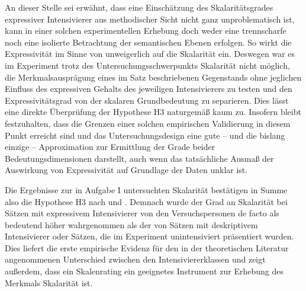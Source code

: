 An dieser Stelle sei erwähnt, dass eine Einschätzung des Skalaritätsgrades expressiver Intensivierer aus methodischer Sicht nicht ganz unproblematisch ist, kann in einer solchen experimentellen Erhebung doch weder eine trennscharfe noch eine isolierte Betrachtung der semantischen Ebenen erfolgen. So wirkt die Expressivität im Sinne von \citet[133]{Gutzmann.2019a} unweigerlich auf die Skalarität ein. Deswegen war es im Experiment trotz des Untersuchungsschwerpunkts Skalarität nicht möglich, die Merkmalsausprägung eines im Satz beschriebenen Gegenstands ohne jeglichen Einfluss des expressiven Gehalts des jeweiligen Intensivierers zu testen und den Expressivitätsgrad von der skalaren Grundbedeutung zu separieren. Dies lässt eine direkte Überprüfung der Hypothese H3 naturgemäß kaum zu. Insofern bleibt festzuhalten, dass die Grenzen einer solchen empirischen Validierung in diesem Punkt erreicht sind und das Untersuchungsdesign eine gute – und die bislang einzige – Approximation zur Ermittlung der Grade beider Bedeutungsdimensionen darstellt, auch wenn das tatsächliche Ausmaß der Auswirkung von Expressivität auf Grundlage der Daten unklar ist.


Die Ergebnisse zur in Aufgabe I untersuchten Skalarität bestätigen in Summe also die Hypothese H3 nach \citet[22]{Paradis.1997} und \citet[133]{Gutzmann.2019a}. Demnach wurde der Grad an Skalarität bei Sätzen mit expressivem Intensivierer von den Versuchspersonen de facto als bedeutend höher wahrgenommen als der von Sätzen mit deskriptivem Intensivierer oder Sätzen, die im Experiment unintensiviert präsentiert wurden. Dies liefert die erste empirische Evidenz für den in der theoretischen Literatur angenommenen Unterschied zwischen den Intensiviererklassen und zeigt außerdem, dass ein Skalenrating ein geeignetes Instrument zur Erhebung des Merkmals Skalarität ist.






